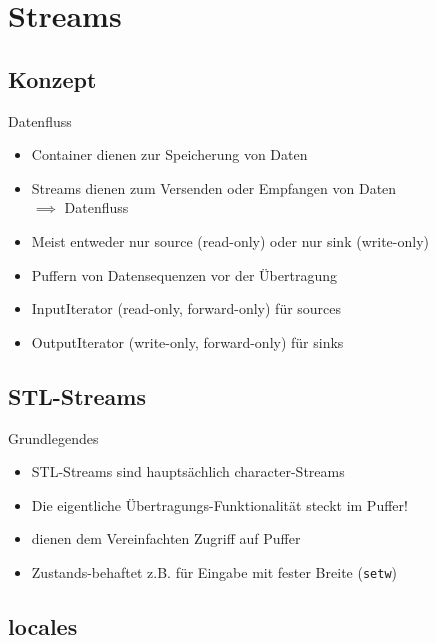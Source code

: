 \section{Streams}


\subsection{Konzept}

\begin{frame}{Datenfluss}
	\begin{itemize}
		\item Container dienen zur Speicherung von Daten
		\item Streams dienen zum Versenden oder Empfangen von Daten\\
		      $\implies$ Datenfluss
		\item Meist entweder nur source (read-only) oder nur sink (write-only)
		\item Puffern von Datensequenzen vor der Übertragung
		\item InputIterator (read-only, forward-only) für sources
		\item OutputIterator (write-only, forward-only) für sinks
	\end{itemize}
\end{frame}


\subsection{STL-Streams}

\begin{frame}[fragile]{Grundlegendes}
	\begin{itemize}
		\item STL-Streams sind hauptsächlich character-Streams
		\item Die eigentliche Übertragungs-Funktionalität steckt im Puffer!
		\item dienen dem Vereinfachten Zugriff auf Puffer
		\item Zustands-behaftet z.B. für Eingabe mit fester Breite (\verb|setw|)
	\end{itemize}
\end{frame}


\subsection{locales}

